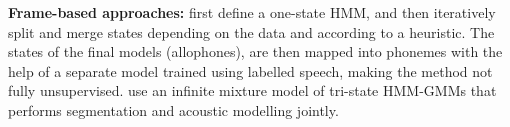 
\textbf{Frame-based approaches:} %
\textcite{varadarajan2008unsupervised} first define a one-state HMM, and then iteratively split and merge states depending on the data and according to a heuristic.
The states of the final models (allophones), are then mapped into phonemes with the help of a separate model trained using labelled speech, making the method not fully unsupervised.
\textcite{lee2012nonparametric} use an infinite mixture model of tri-state HMM-GMMs that performs segmentation and acoustic modelling jointly.
